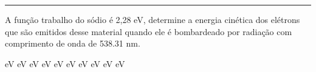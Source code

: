 \documentclass[12pt, addpoints]{exam}
\begin{document}
        \vspace{0.5cm} \hrule \vspace{0.5cm}
        \begin{questions}
\begin{multicols*}{2}
\question A função trabalho do sódio é 2,28 eV, determine a energia cinética dos elétrons que são emitidos desse material quando ele é bombardeado por radiação com comprimento de onda de  538.31 nm.

\begin{oneparchoices}
 eV eV eV eV eV eV eV eV eV eV
\end{oneparchoices}\end{multicols*}
\end{questions}
\newpage
\end{document}
